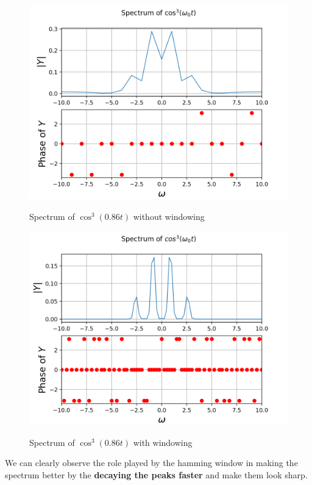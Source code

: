 \documentclass[11pt, a4paper]{article}
\begin{document}
\begin{figure}[H]
   	\centering
   	\includegraphics[scale=0.8]{qn2_wo.png}
   	\label{fig:qn2_wo}
   	\caption{Spectrum of $\cos^3(0.86 t)$ without windowing}
\end{figure}
\begin{figure}[H]
   	\centering
   	\includegraphics[scale=0.8]{qn2_wnd.png}
   	\label{fig:qn2_wnd}
   	\caption{Spectrum of $\cos^3(0.86 t)$ with windowing}
\end{figure}
{
We can clearly observe the role played by the hamming window in making the spectrum better by the \textbf{decaying the peaks faster} and make them look sharp.
}
\end{document}
